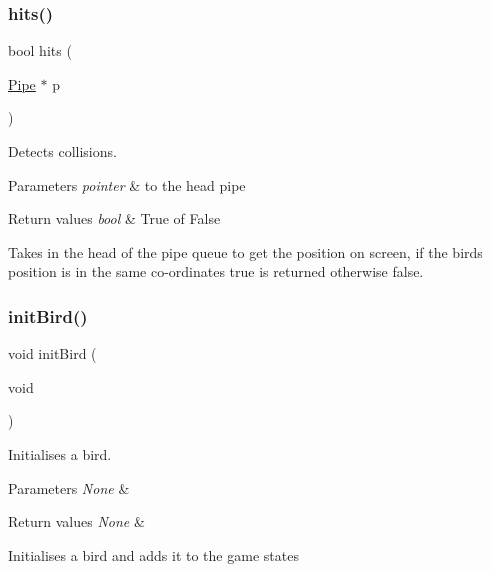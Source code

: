 \subsubsection{\texorpdfstring{hits()}{hits()}}
{\footnotesize\ttfamily bool hits (\begin{DoxyParamCaption}\item[{\hyperlink{struct_pipe}{Pipe} $\ast$}]{p }\end{DoxyParamCaption})}



Detects collisions. 


\begin{DoxyParams}{Parameters}
{\em pointer} & to the head pipe \\
\hline
\end{DoxyParams}

\begin{DoxyRetVals}{Return values}
{\em bool} & True of False\\
\hline
\end{DoxyRetVals}
Takes in the head of the pipe queue to get the position on screen, if the birds position is in the same co-\/ordinates true is returned otherwise false. \mbox{\label{group___flappy___bird_ga2aac1cc1c29f5be4955f4bbf802289c6}} 
\subsubsection{\texorpdfstring{init\+Bird()}{initBird()}}
{\footnotesize\ttfamily void init\+Bird (\begin{DoxyParamCaption}\item[{void}]{ }\end{DoxyParamCaption})}



Initialises a bird. 


\begin{DoxyParams}{Parameters}
{\em None} & \\
\hline
\end{DoxyParams}

\begin{DoxyRetVals}{Return values}
{\em None} & \\
\hline
\end{DoxyRetVals}
Initialises a bird and adds it to the game states \mbox{\label{group___flappy___bird_gaf8cb5edf1854b35a943571697abdcdec}} 
